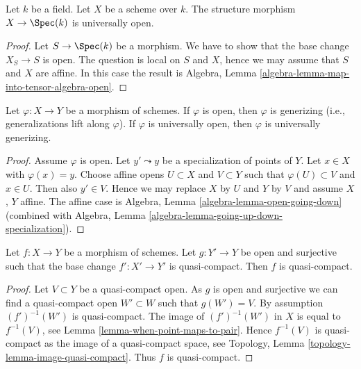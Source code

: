 \begin{lemma}
\label{lemma-scheme-over-field-universally-open}
Let $k$ be a field. Let $X$ be a scheme over $k$.
The structure morphism $X \to \Spec(k)$ is universally open.
\end{lemma}

\begin{proof}
Let $S \to \Spec(k)$ be a morphism.
We have to show that the base change $X_S \to S$ is open.
The question is local on $S$ and $X$, hence we may assume that
$S$ and $X$ are affine. In this case the result is
Algebra, Lemma \ref{algebra-lemma-map-into-tensor-algebra-open}.
\end{proof}

\begin{lemma}
\label{lemma-open-generizing}
Let $\varphi : X \to Y$ be a morphism of schemes.
If $\varphi$ is open, then $\varphi$ is generizing
(i.e., generalizations lift along $\varphi$).
If $\varphi$ is universally open, then $\varphi$ is
universally generizing.
\end{lemma}

\begin{proof}
Assume $\varphi$ is open.
Let $y' \leadsto y$ be a specialization of points of $Y$.
Let $x \in X$ with $\varphi(x) = y$.
Choose affine opens $U \subset X$ and $V \subset Y$ such that
$\varphi(U) \subset V$ and $x \in U$. Then also $y' \in V$. Hence we
may replace $X$ by $U$ and $Y$ by $V$ and assume $X$, $Y$ affine.
The affine case is
Algebra, Lemma \ref{algebra-lemma-open-going-down}
(combined with
Algebra, Lemma \ref{algebra-lemma-going-up-down-specialization}).
\end{proof}

\begin{lemma}
\label{lemma-descent-quasi-compact}
Let $f : X \to Y$ be a morphism of schemes.
Let $g : Y' \to Y$ be open and surjective such that the base change
$f' : X' \to Y'$ is quasi-compact. Then $f$ is quasi-compact.
\end{lemma}

\begin{proof}
Let $V \subset Y$ be a quasi-compact open. As $g$ is open and surjective
we can find a quasi-compact open $W' \subset W$ such that $g(W') = V$.
By assumption $(f')^{-1}(W')$ is quasi-compact. The image of
$(f')^{-1}(W')$ in $X$ is equal to $f^{-1}(V)$, see
Lemma \ref{lemma-when-point-maps-to-pair}.
Hence $f^{-1}(V)$ is quasi-compact as the image of a quasi-compact space, see
Topology, Lemma \ref{topology-lemma-image-quasi-compact}.
Thus $f$ is quasi-compact.
\end{proof}






